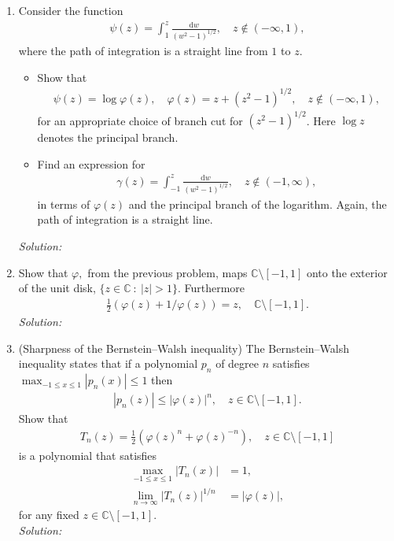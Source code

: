 \documentclass[10pt]{amsart}
\newcommand{\D}{\mathrm{d}}
\theoremstyle{nonumberplain}
\begin{document}
\begin{enumerate}[label={\bf {\arabic*}:}]
  \item Consider the function
    \begin{align*}
     \psi(z) = \int_1^z \frac{\D w}{(w^2 - 1)^{1/2}}, \quad z \not \in
      (-\infty, 1),
    \end{align*}
    where the path of integration is a straight line from $1$ to $z$.
    \begin{itemize}
   \item  Show that
    \begin{align*}
      \psi(z) = \log \varphi(z), \quad \varphi(z) = z + (z^2 -
      1)^{1/2}, \quad z \not \in
      (-\infty, 1),
    \end{align*}
   for an appropriate choice of branch cut for $(z^2 -
   1)^{1/2}$.  Here $\log z$ denotes the principal branch.
   \item Find an expression for
   \begin{align*}
     \gamma(z) = \int_{-1}^z \frac{\D w}{(w^2 - 1)^{1/2}}, \quad z \not \in
      (-1, \infty),
   \end{align*}
   in terms of $\varphi(z)$ and the principal branch of the logarithm.  Again, the path of integration is a
   straight line.
 \end{itemize}
 \textit{Solution:} \\

 \item Show that $\varphi,$ from the previous problem, maps $\mathbb C \setminus [-1,1]$ onto the
   exterior of the unit disk, $\{ z \in \mathbb C ~:~ |z| > 1\}$.
   Furthermore
   \begin{align*}
     \frac 1 2 \left( \varphi(z) + 1/\varphi(z) \right) = z, \quad \mathbb C \setminus [-1,1].
   \end{align*}
\textit{Solution:} \\

   \item (Sharpness of the Bernstein--Walsh inequality)  The
     Bernstein--Walsh inequality states that if a polynomial $p_n$ of
     degree $n$ satisfies $\max_{-1 \leq x \leq 1} |p_n(x)| \leq 1$
     then
     \begin{align*}
       |p_n(z)| \leq |\varphi(z)|^n, \quad z \in \mathbb C \setminus [-1,1].
     \end{align*}
     Show that
     \begin{align*}
        T_n(z) = \frac 1 2 \left( \varphi(z)^n + \varphi(z)^{-n}
       \right), \quad z \in \mathbb C \setminus [-1,1]
     \end{align*}
     is a polynomial that satisfies
     \begin{align*}
       \max_{-1 \leq x \leq 1} |T_n(x)| &= 1,\\
       \lim_{n \to \infty} |T_n(z)|^{1/n} &= |\varphi(z)|,
     \end{align*}
     for any fixed $z \in \mathbb C \setminus [-1,1]$. \\
\textit{Solution:} \\
\end{enumerate}
\end{document}
